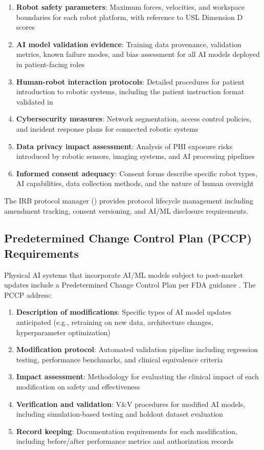\documentclass[11pt,letterpaper]{article}
\begin{document}
\begin{enumerate}
  \item \textbf{Robot safety parameters}: Maximum forces, velocities, and workspace boundaries for each robot platform, with reference to USL Dimension D scores
  \item \textbf{AI model validation evidence}: Training data provenance, validation metrics, known failure modes, and bias assessment for all AI models deployed in patient-facing roles
  \item \textbf{Human-robot interaction protocols}: Detailed procedures for patient introduction to robotic systems, including the patient instruction format validated in \cite{kawchak2026patient}
  \item \textbf{Cybersecurity measures}: Network segmentation, access control policies, and incident response plans for connected robotic systems
  \item \textbf{Data privacy impact assessment}: Analysis of PHI exposure risks introduced by robotic sensors, imaging systems, and AI processing pipelines
  \item \textbf{Informed consent adequacy}: Consent forms \SHALL{} describe specific robot types, AI capabilities, data collection methods, and the nature of human oversight
\end{enumerate}

The IRB protocol manager () provides protocol lifecycle management including amendment tracking, consent versioning, and AI/ML disclosure requirements.

\subsection{Predetermined Change Control Plan (PCCP) Requirements}

Physical AI systems that incorporate AI/ML models subject to post-market updates \SHALL{} include a Predetermined Change Control Plan per FDA guidance \cite{fda2025aiml}. The PCCP \SHALL{} address:

\begin{enumerate}
  \item \textbf{Description of modifications}: Specific types of AI model updates anticipated (e.g., retraining on new data, architecture changes, hyperparameter optimization)
  \item \textbf{Modification protocol}: Automated validation pipeline including regression testing, performance benchmarks, and clinical equivalence criteria
  \item \textbf{Impact assessment}: Methodology for evaluating the clinical impact of each modification on safety and effectiveness
  \item \textbf{Verification and validation}: V\&V procedures for modified AI models, including simulation-based testing and holdout dataset evaluation
  \item \textbf{Record keeping}: Documentation requirements for each modification, including before/after performance metrics and authorization records
\end{enumerate}
\end{document}
